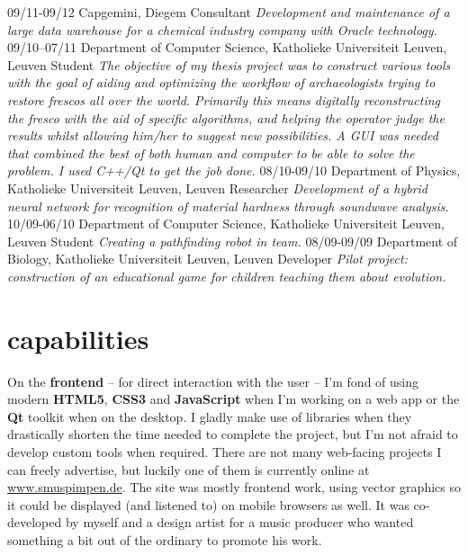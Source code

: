 \documentclass[]{friggeri-cv}
\begin{document}
\begin{entrylist}
  \entry
    {09/11-09/12}
    {Capgemini, Diegem}
    {Consultant}
    {\emph{Development and maintenance of a large data warehouse for a chemical industry company with Oracle technology.}}
  \entry
    {09/10--07/11}
    {Department of Computer Science, Katholieke Universiteit Leuven, Leuven}
    {Student}
    {\emph{The objective of my thesis project was to construct various tools with the goal of aiding and optimizing the workflow of archaeologists trying to restore frescos all over the world. Primarily this means digitally reconstructing the fresco with the aid of specific algorithms, and helping the operator judge the results whilst allowing him/her to suggest new possibilities. A GUI was needed that combined the best of both human and computer to be able to solve the problem. I used C++/Qt to get the job done.}}
  \entry
    {08/10-09/10}
    {Department of Physics, Katholieke Universiteit Leuven, Leuven}
    {Researcher}
    {\emph{Development of a hybrid neural network for recognition of material hardness through soundwave analysis.}}
  \entry
    {10/09-06/10}
    {Department of Computer Science, Katholieke Universiteit Leuven, Leuven}
    {Student}
    {\emph{Creating a pathfinding robot in team.}}
  \entry
    {08/09-09/09}
    {Department of Biology, Katholieke Universiteit Leuven, Leuven}
    {Developer}
    {\emph{Pilot project: construction of an educational game for children teaching them about evolution.}}
\end{entrylist}

\section{capabilities}

On the \textbf{frontend} -- for direct interaction with the user -- I'm fond of using modern \textbf{HTML5}, \textbf{CSS3} and \textbf{JavaScript} when I'm working on a web app or the \textbf{Qt} toolkit when on the desktop. I gladly make use of libraries when they drastically shorten the time needed to complete the project, but I'm not afraid to develop custom tools when required. There are not many web-facing projects I can freely advertise, but luckily one of them is currently online at \url{www.smuspimpen.de}. The site was mostly frontend work, using vector graphics so it could be displayed (and listened to) on mobile browsers as well. It was co-developed by myself and a design artist for a music producer who wanted something a bit out of the ordinary to promote his work.
\end{document}
